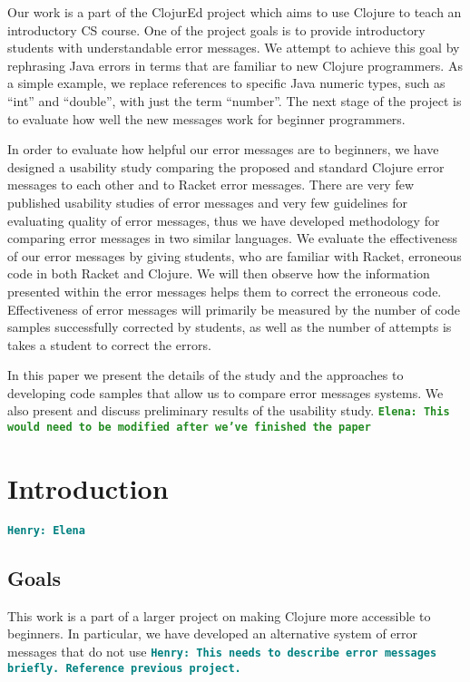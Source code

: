 \documentclass[12pt]{article}
\newcommand{\comment}[1]{{\bf \tt  {#1}}}
\newcommand{\emcomment}[1]{\textcolor{ForestGreen}{\comment{Elena: {#1}}}}
\newcommand{\hfcomment}[1]{\textcolor{Teal}{\comment{Henry: {#1}}}}
\begin{document}
Our work is a part of the ClojurEd project which aims to use Clojure to teach an introductory CS course. One of the project goals is to provide introductory students with understandable error messages. We attempt to achieve this goal by rephrasing Java errors in terms that are familiar to new Clojure programmers. As a simple example, we replace references to specific Java numeric types, such as “int” and “double”, with just the term “number”. The next stage of the project is to evaluate how well the new messages work for beginner programmers. 

In order to evaluate how helpful our error messages are to beginners, we have designed a usability study comparing the proposed and standard Clojure error messages to each other and to Racket error messages. There are very few published usability studies of error messages and very few guidelines for evaluating quality of error messages, thus we have developed methodology for comparing error messages in two similar languages. We evaluate the effectiveness of our error messages by giving students, who are familiar with Racket, erroneous code in both Racket and Clojure. We will then observe how the information presented within the error messages helps them to correct the erroneous code. Effectiveness of error messages will primarily be measured by the number of code samples successfully corrected by students, as well as the number of attempts is takes a student to correct the errors. 

In this paper we present the details of the study and the approaches to developing code samples that allow us to compare error messages systems. We also present and discuss preliminary results of the usability study. 
\emcomment{This would need to be modified after we've finished the paper}
\newpage
\setcounter{page}{1}

\section{Introduction}\label{sec:intro}
	\hfcomment{Elena}

	\subsection{Goals}\label{sec:goals}
This work is a part of a larger project on making Clojure more accessible to beginners. In particular, we have developed an alternative system of error messages that do not use 
	\hfcomment{This needs to describe error messages briefly. Reference previous project.}
\end{document}
